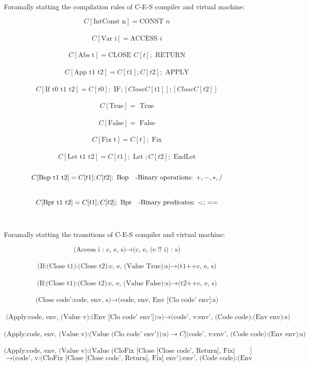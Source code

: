 \documentclass[10pt]{article}
\begin{document}
\paragraph{}
Foramally statting the compilation rules of C-E-S compiler and virtual machine:

\[
        C[\text{IntConst n}] = \text{CONST } n
\]
\ \\
\[
        C[\text{Var i}] = \text{ACCESS } i
\]
\ \\
\[
        C[\text{Abs t}] = \text{CLOSE } C[t]; \text{ RETURN}
\]
\ \\
\[
        C[\text{App t1 t2}] = C[t1]; C[t2]; \text{ APPLY}
\]
\ \\
\[
        C[\text{If t0 t1 t2}] = C[t0]; \text{ IF}; [Close C[t1]]; [Close C[t2]] 
\]
\ \\
\[
        C[\text{True}] = \text{ True}
\]
\ \\
\[
        C[\text{False}] = \text{ False}
\]
\ \\
\[
        C[\text{Fix t}] = C[t]; \text{ Fix}
\]
\ \\
\[
        C[\text{Let t1 t2}] = C[t1]; \text{ Let }; C[t2]; \text{ EndLet} 
\]
\ \\
\[
        C[\text{Bop t1 t2}] = C[t1]; C[t2]; \text{ Bop} \text{\quad -Binary operations: $+, -, *, /$}  
\]
\ \\
\[
        C[\text{Bpr t1 t2}] = C[t1]; C[t2]; \text{ Bpr} \text{\quad -Binary predicates: $<$; $==$}  
\]
\ \\

\paragraph{}
Foramally statting the transitions of C-E-S compiler and virtual machine:

\[
        \text{(Access i : c, e, s)} \rightarrow \text{(c, e, (e !! i) : s)}  
\]
\ \\
\[
        \text{(If:(Close t1):(Close t2):c, e, (Value True):s)} \rightarrow \text{(t1++c, e, s)}  
\]
\ \\
\[
        \text{(If:(Close t1):(Close t2):c, e, (Value False):s)} \rightarrow \text{(t2++c, e, s)}  
\]
\ \\

\[
        \text{(Close code':code, env, s)} \rightarrow \text{(code, env, Env [Clo code' env]:s)}  
\]
\ \\

\[
        \text{(Apply:code, env, (Value v):(Env [Clo code' env']):s)} \rightarrow \text{(code', v:env', (Code code):(Env env):s)}  
\]
\ \\
\[
        \text{(Apply:code, env, (Value v):(Value (Clo code' env')):s)} \rightarrow C[\text{(code', v:env', (Code code):(Env env):s)}  
\]
\ \\
\[
        \text{(Apply:code, env, (Value v):(Value (CloFix [Close [Close code', Return], Fix] env')):s)}]    
\]
\[
        \rightarrow \text{(code', v:(CloFix [Close [Close code', Return], Fix] env'):env', (Code code):(Env env):s)}    
\]
\end{document}
